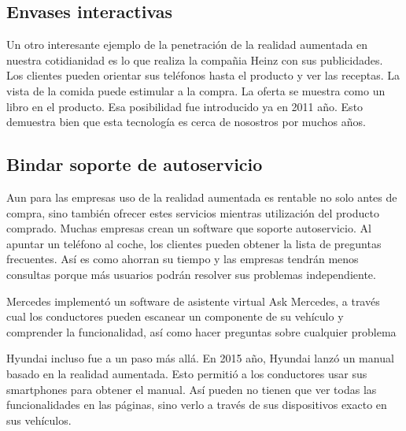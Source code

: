\documentclass[a4paper,11pt]{scrartcl}
\begin{document}
\subsection{Envases interactivas}
Un otro interesante ejemplo de la penetración de la realidad aumentada en nuestra cotidianidad es lo que realiza la compañia Heinz con sus publicidades. Los clientes pueden orientar sus teléfonos hasta el producto y ver las receptas. La vista de la comida puede estimular a la compra. La oferta se muestra como un libro en el producto. Esa posibilidad fue introducido ya en 2011 año. Esto demuestra bien que esta tecnología es cerca de nosostros por muchos años.

\subsection{Bindar soporte de autoservicio}
Aun para las empresas uso de la realidad aumentada es rentable no solo antes de compra, sino también ofrecer estes servicios mientras utilización del producto comprado. Muchas empresas crean un software que soporte autoservicio. Al apuntar un teléfono al coche, los clientes pueden obtener la lista de preguntas frecuentes. Así es como ahorran su tiempo y las empresas tendrán menos consultas porque más usuarios podrán resolver sus problemas independiente. \\
\par Mercedes implementó un software de asistente virtual Ask Mercedes, a través cual los conductores pueden escanear un componente de su vehículo y comprender la funcionalidad, así como hacer preguntas sobre cualquier problema \\

\par Hyundai incluso fue a un paso más allá. En 2015 año, Hyundai lanzó un manual basado en la realidad aumentada. Esto permitió a los conductores usar sus smartphones para obtener el manual. Así pueden no tienen que ver todas las funcionalidades en las páginas, sino verlo a través de sus dispositivos exacto en sus vehículos.
\end{document}

